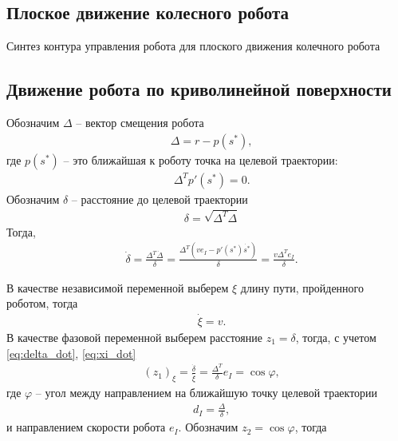\documentclass[a4paper,12pt]{article}
\begin{document}
\subsection{Плоское движение колесного робота}
Синтез контура управления робота для плоского движения колечного робота 

\subsection{Движение робота по криволинейной поверхности}

Обозначим $\Delta$ -- вектор смещения робота
\begin{align}  \label{eq:Delta}
&\Delta = r - p(s^*),
\end{align}
где $p(s^*)$ -- это ближайшая к роботу точка на целевой траектории:
\begin{align}\label{eq:ort}
&\Delta^T p'(s^*) = 0.
\end{align}
Обозначим $\delta$ -- расстояние до целевой траектории
\begin{align}  \label{eq:delta}
&\delta = \sqrt{\Delta^T \Delta}
\end{align}
Тогда,
\begin{align}  \label{eq:delta_dot}
&\dot \delta = \frac{\Delta^T \dot \Delta}{\delta} = \frac{\Delta^T (ve_I - p'(s^*) \dot {s^*})}{\delta} = 
\frac{v \Delta^T e_I}{\delta}.
\end{align}

В качестве независимой переменной выберем
$\xi$ длину пути, пройденного роботом, тогда 
\begin{align}  \label{eq:xi_dot}
&\dot \xi = v.
\end{align}
В качестве фазовой переменной выберем расстояние
$z_1 = \delta$,
тогда, с учетом \eqref{eq:delta_dot}, \eqref{eq:xi_dot}
\begin{align}  \label{eq:z1_dxi}
&(z_1)_{\xi} = \frac{\dot \delta}{\dot \xi} = \frac{\Delta^T }{\delta} e_I = \cos \varphi, 
\end{align}
где $\varphi$ -- угол между направлением на ближайшую точку целевой траектории
\begin{align}  \label{eq:d_I}
&d_I = \frac{\Delta }{\delta}, 
\end{align}
и направлением скорости робота $e_I$.
Обозначим $z_2 = \cos \varphi$, тогда

\end{document}
